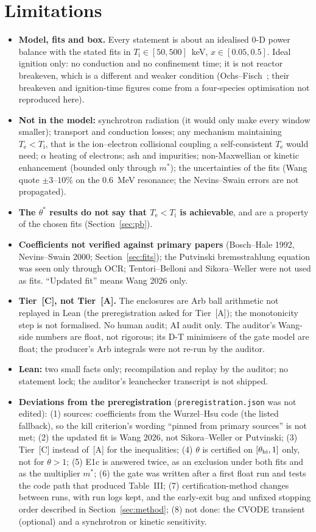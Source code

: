 \documentclass[10pt]{article}
\newcommand{\tier}[1]{\textsf{[#1]}}
\newcommand{\tA}{\tier{A}}
\newcommand{\tC}{\tier{C}}
\newcommand{\Te}{T_{\mathrm e}}
\newcommand{\Ti}{T_{\mathrm i}}
\begin{document}
\section{Limitations}\label{sec:lim}
\begin{itemize}\itemsep=1pt
\item \textbf{Model, fits and box.} Every statement is about an idealised $0$-D power balance with the stated fits in $\Ti\in[50,500]$~keV, $x\in[0.05,0.5]$. Ideal ignition only: no conduction and no confinement time; it is not reactor breakeven, which is a different and weaker condition (Ochs--Fisch~\cite{of}; their breakeven and ignition-time figures come from a four-species optimisation not reproduced here).
\item \textbf{Not in the model:} synchrotron radiation (it would only make every window smaller); transport and conduction losses; any mechanism maintaining $\Te<\Ti$, that is the ion--electron collisional coupling a self-consistent $\Te$ would need; $\alpha$ heating of electrons; ash and impurities; non-Maxwellian or kinetic enhancement (bounded only through $m^\ast$); the uncertainties of the fits (Wang quote $\pm3$--$10\%$ on the $0.6$~MeV resonance; the Nevins--Swain errors are not propagated).
\item \textbf{The $\theta^\ast$ results do not say that $\Te<\Ti$ is achievable}, and are a property of the chosen fits (Section~\ref{sec:pb}).
\item \textbf{Coefficients not verified against primary papers} (Bosch--Hale 1992, Nevins--Swain 2000; Section~\ref{sec:fits}); the Putvinski bremsstrahlung equation was seen only through OCR; Tentori--Belloni and Sikora--Weller were not used as fits. ``Updated fit'' means Wang 2026 only.
\item \textbf{Tier~\tC{}, not Tier~\tA{}.} The enclosures are Arb ball arithmetic not replayed in Lean (the preregistration asked for Tier~\tA{}); the monotonicity step is not formalised. No human audit; AI audit only. The auditor's Wang-side numbers are float, not rigorous; its D-T minimisers of the gate model are float; the producer's Arb integrals were not re-run by the auditor.
\item \textbf{Lean:} two small facts only; recompilation and replay by the auditor; no statement lock; the auditor's leanchecker transcript is not shipped.
\item \textbf{Deviations from the preregistration} (\texttt{preregistration.json} was not edited): (1) sources: coefficients from the Wurzel--Hsu code (the listed fallback), so the kill criterion's wording ``pinned from primary sources'' is not met; (2) the updated fit is Wang 2026, not Sikora--Weller or Putvinski; (3) Tier~\tC{} instead of~\tA{} for the inequalities; (4) $\theta$ is certified on $[\theta_{\rm hi},1]$ only, not for $\theta>1$; (5) E1c is answered twice, as an exclusion under both fits and as the multiplier $m^\ast$; (6) the gate was written after a first float run and tests the code path that produced Table~III; (7) certification-method changes between runs, with run logs kept, and the early-exit bug and unfixed stopping order described in Section~\ref{sec:method}; (8) not done: the CVODE transient (optional) and a synchrotron or kinetic sensitivity.

\end{itemize}
\end{document}
